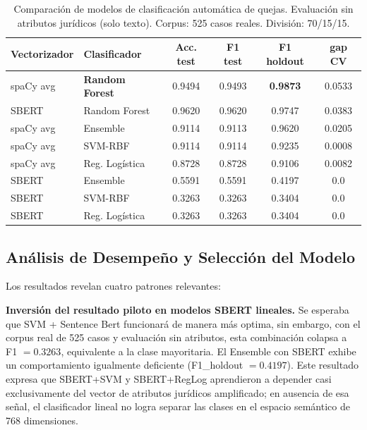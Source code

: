 \begin{table}[H]
\centering
\caption{Comparación de modelos de clasificación automática de quejas.
Evaluación sin atributos jurídicos (solo texto). Corpus: 525 casos reales.
División: 70/15/15.}
\label{tab:resultados_comparacion}
\begin{tabularx}{\textwidth}{llCCCC}
\toprule
\textbf{Vectorizador} & \textbf{Clasificador}
  & \textbf{Acc. test} & \textbf{F1 test}
  & \textbf{F1 holdout} & \textbf{gap CV} \\
\midrule
spaCy avg & \textbf{Random Forest}  & 0.9494 & 0.9493 & \textbf{0.9873} & 0.0533 \\
SBERT     & Random Forest           & 0.9620 & 0.9620 & 0.9747          & 0.0383 \\
spaCy avg & Ensemble                & 0.9114 & 0.9113 & 0.9620          & 0.0205 \\
spaCy avg & SVM-RBF                 & 0.9114 & 0.9114 & 0.9235          & 0.0008 \\
spaCy avg & Reg. Logística          & 0.8728 & 0.8728 & 0.9106          & 0.0082 \\
SBERT     & Ensemble                & 0.5591 & 0.5591 & 0.4197          & 0.0    \\
SBERT     & SVM-RBF                 & 0.3263 & 0.3263 & 0.3404          & 0.0    \\
SBERT     & Reg. Logística          & 0.3263 & 0.3263 & 0.3404          & 0.0    \\
\bottomrule
\end{tabularx}
\end{table}

\subsection{Análisis de Desempeño y Selección del Modelo}
\label{subsec:analisis}

Los resultados revelan cuatro patrones relevantes:

\textbf{Inversión del resultado piloto en modelos SBERT lineales.} Se esperaba que SVM + Sentence Bert funcionará de manera más optima, sin embargo, con el corpus real de 525 casos y evaluación sin atributos, esta combinación colapsa a F1 $= 0.3263$, equivalente a la clase mayoritaria. El Ensemble con SBERT
exhibe un comportamiento igualmente deficiente (F1\_holdout $= 0.4197$).
Este resultado expresa que SBERT+SVM y SBERT+RegLog aprendieron a
depender casi exclusivamente del vector de atributos jurídicos amplificado;
en ausencia de esa señal, el clasificador lineal no logra separar las
clases en el espacio semántico de 768 dimensiones.

